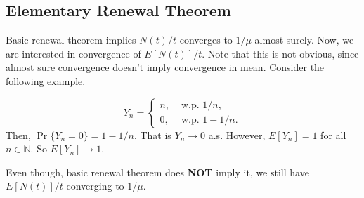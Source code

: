 \documentclass[a4paper,10pt]{article}
\begin{document}
\subsection{Elementary Renewal Theorem}
Basic renewal theorem implies $N(t)/t$ converges to $1/\mu$ almost surely. Now, we are interested in convergence of $E[N(t)]/t$. Note that this is not obvious, since almost sure convergence doesn't imply convergence in mean. Consider the following example.
\begin{exmp}
\begin{equation*}
Y_n = \begin{cases}
n, & \mbox{ w.p.  } 1/n,\\
0, & \mbox{ w.p.  } 1- 1/n.
\end{cases}
\end{equation*}
Then, $\Pr\{ Y_n = 0 \} = 1 - 1/n$. %
That is $Y_n \to 0$ a.s. However, $E[Y_n] = 1$ for all $n \in \mathbb{N}$. So $E[Y_n] \to 1$.
\end{exmp}
Even though, basic renewal theorem does \textbf{NOT} imply it, we still have $E[N(t)]/t$ converging to $1/\mu$.
\end{document}

